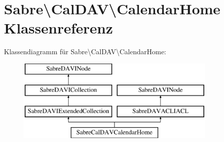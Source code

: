 \hypertarget{class_sabre_1_1_cal_d_a_v_1_1_calendar_home}{}\section{Sabre\textbackslash{}Cal\+D\+AV\textbackslash{}Calendar\+Home Klassenreferenz}
\label{class_sabre_1_1_cal_d_a_v_1_1_calendar_home}
Klassendiagramm für Sabre\textbackslash{}Cal\+D\+AV\textbackslash{}Calendar\+Home\+:\begin{figure}[H]
\begin{center}
\leavevmode
\includegraphics[height=4.000000cm]{class_sabre_1_1_cal_d_a_v_1_1_calendar_home}
\end{center}
\end{figure}
